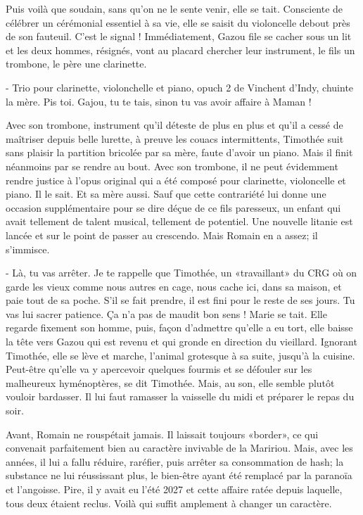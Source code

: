 Puis voilà que soudain, sans qu’on ne le sente venir, elle se tait. Consciente de célébrer un cérémonial essentiel à sa vie, elle se saisit du violoncelle debout près de son fauteuil. C’est le signal ! Immédiatement, Gazou file se cacher sous un lit et les deux hommes, résignés, vont au placard chercher leur instrument, le fils un trombone, le père une clarinette.

- Trio pour clarinette, violonchelle et piano, opuch 2 de Vinchent d’Indy, chuinte la mère. Pis toi. Gajou, tu te tais, sinon tu vas avoir affaire à Maman !

Avec son trombone, instrument qu’il déteste de plus en plus et qu’il a cessé de maîtriser depuis belle lurette, à preuve les couacs intermittents, Timothée suit sans plaisir la partition bricolée par sa mère, faute d’avoir un piano. Mais il finit néanmoins par se rendre au bout. Avec son trombone, il ne peut évidemment rendre justice à l’opus original qui a été composé pour clarinette, violoncelle et piano. Il le sait. Et sa mère aussi. Sauf que cette contrariété lui donne une occasion supplémentaire pour se dire déçue de ce fils paresseux, un enfant qui avait tellement de talent musical, tellement de potentiel. Une nouvelle litanie est lancée et sur le point de passer au crescendo. Mais Romain en a assez; il s’immisce.

- Là, tu vas arrêter. Je te rappelle que Timothée, un «travaillant» du CRG où on garde les vieux comme nous autres en cage, nous cache ici, dans sa maison, et paie tout de sa poche. S’il se fait prendre, il est fini pour le reste de ses jours. Tu vas lui sacrer patience. Ça n’a pas de maudit bon sens !
Marie se tait. Elle regarde fixement son homme, puis, façon d’admettre qu’elle a eu tort, elle baisse la tête vers Gazou qui est revenu et qui gronde en direction du vieillard. Ignorant Timothée, elle se lève et marche, l’animal grotesque à sa suite, jusqu’à la cuisine. Peut-être qu’elle va y apercevoir quelques fourmis et se défouler sur les malheureux hyménoptères, se dit Timothée. Mais, au son, elle semble plutôt vouloir bardasser. Il lui faut ramasser la vaisselle du midi et préparer le repas du soir.

Avant, Romain ne rouspétait jamais. Il laissait toujours «border», ce qui convenait parfaitement bien au caractère invivable de la Maririou. Mais, avec les années, il lui a fallu réduire, raréfier, puis arrêter sa consommation de hash; la substance ne lui réussissant plus, le bien-être ayant été remplacé par la paranoïa et l’angoisse. Pire, il y avait eu l’été 2027 et cette affaire ratée depuis laquelle, tous deux étaient reclus. Voilà qui suffit amplement à changer un caractère.

